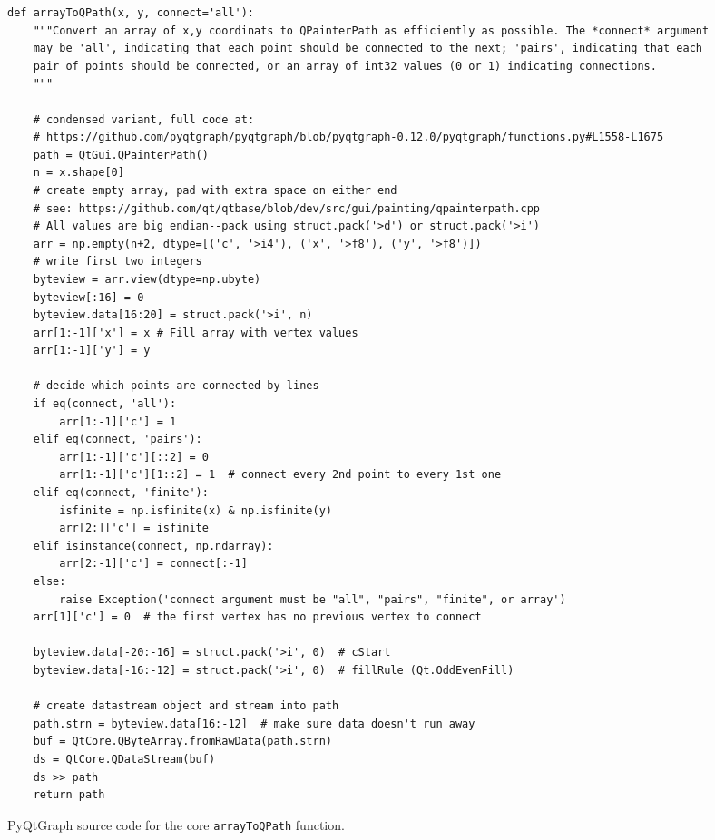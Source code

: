 \renewcommand\textfraction{.05}
\begin{table*}[!hbt]
\begin{verbatim}
def arrayToQPath(x, y, connect='all'):
    """Convert an array of x,y coordinats to QPainterPath as efficiently as possible. The *connect* argument
    may be 'all', indicating that each point should be connected to the next; 'pairs', indicating that each
    pair of points should be connected, or an array of int32 values (0 or 1) indicating connections.
    """

    # condensed variant, full code at:
    # https://github.com/pyqtgraph/pyqtgraph/blob/pyqtgraph-0.12.0/pyqtgraph/functions.py#L1558-L1675
    path = QtGui.QPainterPath()
    n = x.shape[0]
    # create empty array, pad with extra space on either end
    # see: https://github.com/qt/qtbase/blob/dev/src/gui/painting/qpainterpath.cpp
    # All values are big endian--pack using struct.pack('>d') or struct.pack('>i')
    arr = np.empty(n+2, dtype=[('c', '>i4'), ('x', '>f8'), ('y', '>f8')])
    # write first two integers
    byteview = arr.view(dtype=np.ubyte)
    byteview[:16] = 0
    byteview.data[16:20] = struct.pack('>i', n)
    arr[1:-1]['x'] = x # Fill array with vertex values
    arr[1:-1]['y'] = y

    # decide which points are connected by lines
    if eq(connect, 'all'):
        arr[1:-1]['c'] = 1
    elif eq(connect, 'pairs'):
        arr[1:-1]['c'][::2] = 0
        arr[1:-1]['c'][1::2] = 1  # connect every 2nd point to every 1st one
    elif eq(connect, 'finite'):
        isfinite = np.isfinite(x) & np.isfinite(y)
        arr[2:]['c'] = isfinite
    elif isinstance(connect, np.ndarray):
        arr[2:-1]['c'] = connect[:-1]
    else:
        raise Exception('connect argument must be "all", "pairs", "finite", or array')
    arr[1]['c'] = 0  # the first vertex has no previous vertex to connect

    byteview.data[-20:-16] = struct.pack('>i', 0)  # cStart
    byteview.data[-16:-12] = struct.pack('>i', 0)  # fillRule (Qt.OddEvenFill)
    
    # create datastream object and stream into path
    path.strn = byteview.data[16:-12]  # make sure data doesn't run away
    buf = QtCore.QByteArray.fromRawData(path.strn)
    ds = QtCore.QDataStream(buf)
    ds >> path
    return path
\end{verbatim}
\caption{PyQtGraph source code for the core \texttt{arrayToQPath} function.}
\label{table:arrayToQPath}
\end{table*}

